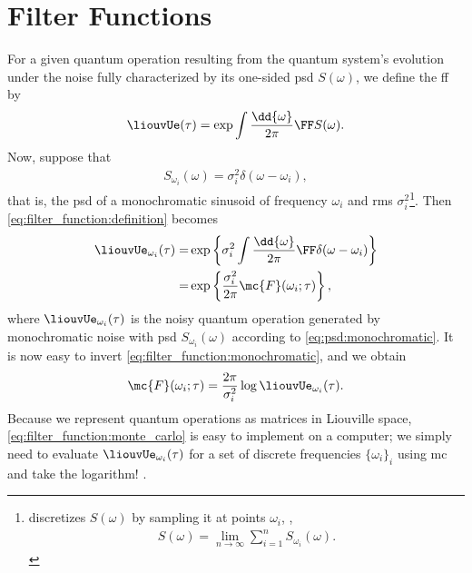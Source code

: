 \chapter{Filter Functions}\label{ch:filter_functions}
For a {\color{RWTHmagenta75} given} quantum operation \liouvUe resulting from the quantum system's evolution under the noise fully characterized by its one-sided \gls{psd} $S(\omega)$, we define the \gls{ff} \FF by
\begin{align}
    \label{eq:filter_function:definition}
    \liouvUe(\tau) = \exp\int\frac{\dd{\omega}}{2\pi}\FF S(\omega).
\end{align}
Now, suppose that
\begin{align}
    \label{eq:psd:monochromatic}
    S_{\omega_i}(\omega) = \sigma_i^2 \delta(\omega - \omega_i), %
\end{align}
that is, the \gls{psd} of a monochromatic sinusoid of frequency $\omega_i$ and \gls{rms} $\sigma_i^2$\footnote{
     discretizes $S(\omega)$ by sampling it at points $\omega_i$, \ie,
    \begin{align}
        S(\omega) = \lim_{n\to\infty}\sum_{i=1}^n S_{\omega_i}(\omega).
    \end{align}
}. %
Then \cref{eq:filter_function:definition} becomes
\begin{equation}
    \label{eq:filter_function:monochromatic}
    \begin{split}
        \liouvUe_{\omega_i}(\tau) =& \exp\left\lbrace\sigma_i^2\int\frac{\dd{\omega}}{2\pi}\FF\delta(\omega - \omega_i)\right\rbrace \\
                             =& \exp\left\lbrace\frac{\sigma_i^2}{2\pi}\mc{F}(\omega_i;\tau)\right\rbrace,
    \end{split}
\end{equation}
where $\liouvUe_{\omega_i}(\tau)$ is the noisy quantum operation generated by monochromatic noise with \gls{psd} $S_{\omega_i}(\omega)$ according to \cref{eq:psd:monochromatic}.
It is now easy to invert \cref{eq:filter_function:monochromatic}, and we obtain
\begin{align}
    \label{eq:filter_function:monte_carlo}
    \mc{F}(\omega_i; \tau) = \frac{2\pi}{\sigma_i^2}\log\liouvUe_{\omega_i}(\tau).
\end{align}
Because we represent quantum operations as matrices in Liouville space, \cref{eq:filter_function:monte_carlo} is easy to implement on a computer; we simply need to evaluate $\liouvUe_{\omega_i}(\tau)$ for a set of discrete frequencies $\lbrace\omega_i\rbrace_i$ using \gls{mc} and take the logarithm! \cite{Geck2021}.%

